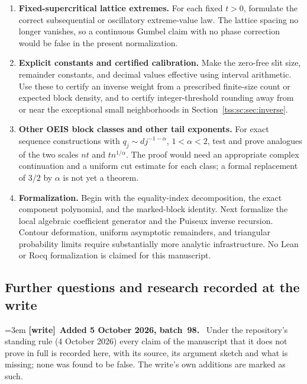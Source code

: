 \documentclass[11pt]{article}
\theoremstyle{remark}\newtheorem{remark}[theorem]{Remark}
\theoremstyle{definition}\newtheorem{definition}[theorem]{Definition}
\newenvironment{writenote}[1][]{\par\smallskip\begingroup\small\emergencystretch=3em
 \noindent\textbf{[write]}\if\relax\detokenize{#1}\relax\else~\textbf{#1.}\fi\ }%
 {\par\endgroup\smallskip}
\begin{document}
\begin{enumerate}[label=\textbf{RQ\arabic*.},leftmargin=3.4em]
\item \textbf{Fixed-supercritical lattice extremes.} For each fixed $t>0$, formulate the correct subsequential or oscillatory extreme-value law. The lattice spacing no longer vanishes, so a continuous Gumbel claim with no phase correction would be false in the present normalization.

\item \textbf{Explicit constants and certified calibration.} Make the zero-free slit size, remainder constants, and decimal values effective using interval arithmetic. Use these to certify an inverse weight from a prescribed finite-size count or expected block density, and to certify integer-threshold rounding away from or near the exceptional small neighborhoods in Section~\ref{tss:sc:sec:inverse}.

\item \textbf{Other OEIS block classes and other tail exponents.} For exact sequence constructions with $q_j\sim d j^{-1-\alpha}$, $1<\alpha<2$, test and prove analogues of the two scales $nt$ and $tn^{1/\alpha}$. The proof would need an appropriate complex continuation and a uniform cut estimate for each class; a formal replacement of $3/2$ by $\alpha$ is not yet a theorem.

\item \textbf{Formalization.} Begin with the equality-index decomposition, the exact component polynomial, and the marked-block identity. Next formalize the local algebraic coefficient generator and the Puiseux inverse recursion. Contour deformation, uniform asymptotic remainders, and triangular probability limits require substantially more analytic infrastructure. No Lean or Rocq formalization is claimed for this manuscript.
\end{enumerate}

\subsection{Further questions and research recorded at the write}
\label{tss:sc:sec:writequestions}
\begin{writenote}[Added 5 October 2026, batch~98]
Under the repository's standing rule (4 October 2026) every claim of the
manuscript that it does not prove in full is recorded here, with its
source, its argument sketch and what is missing; none was found to be
false. The write's own additions are marked as such.
\end{writenote}
\end{document}
